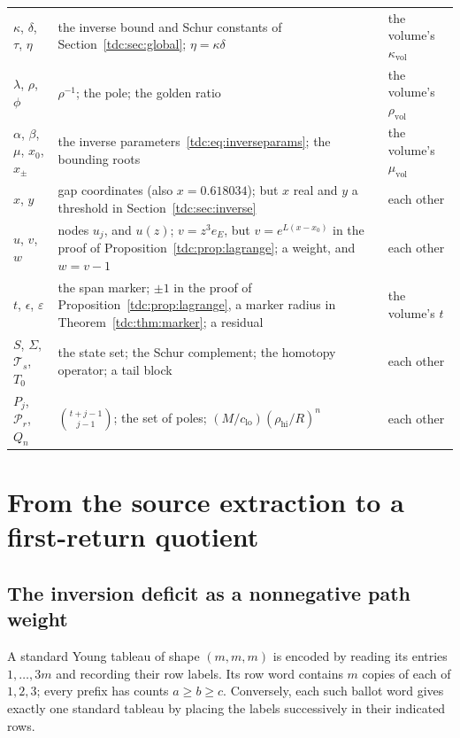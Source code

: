 \documentclass[11pt]{article}
\theoremstyle{definition}\newtheorem{definition}[theorem]{Definition}
\theoremstyle{remark}\newtheorem{remark}[theorem]{Remark}
\newcommand{\PP}{\mathcal P}
\newcommand{\rhoh}{\rho_{\mathrm{hi}}}
\newcommand{\cl}{c_{\mathrm{lo}}}
\begin{document}
\begin{longtable}{@{}>{\raggedright\arraybackslash}p{0.95in}>{\raggedright\arraybackslash}p{3.3in}>{\raggedright\arraybackslash}p{1.85in}@{}}
$\kappa$, $\delta$, $\tau$, $\eta$ & the inverse bound and Schur constants of Section~\ref{tdc:sec:global}; $\eta=\kappa\delta$ & the volume's $\kappa_{\mathrm{vol}}$\\
$\lambda$, $\rho$, $\phi$ & $\rho^{-1}$; the pole; the golden ratio & the volume's $\rho_{\mathrm{vol}}$\\
$\alpha$, $\beta$, $\mu$, $x_0$, $x_\pm$ & the inverse parameters~\eqref{tdc:eq:inverseparams}; the bounding roots & the volume's $\mu_{\mathrm{vol}}$\\
$x$, $y$ & gap coordinates (also $x=0.618034$); but $x$ real and $y$ a threshold in Section~\ref{tdc:sec:inverse} & each other\\
$u$, $v$, $w$ & nodes $u_j$, and $u(z)$; $v=z^3e_E$, but $v=e^{L(x-x_0)}$ in the proof of Proposition~\ref{tdc:prop:lagrange}; a weight, and $w=v-1$ & each other\\
$t$, $\epsilon$, $\varepsilon$ & the span marker; $\pm1$ in the proof of Proposition~\ref{tdc:prop:lagrange}, a marker radius in Theorem~\ref{tdc:thm:marker}; a residual & the volume's $t$\\
$S$, $\Sigma$, $\mathcal T_s$, $T_0$ & the state set; the Schur complement; the homotopy operator; a tail block & each other\\
$P_j$, $\PP_r$, $Q_n$ & $\binom{t+j-1}{j-1}$; the set of poles; $(M/\cl)(\rhoh/R)^n$ & each other\\
\bottomrule
\end{longtable}
\endgroup


\section{From the source extraction to a first-return quotient}
\label{tdc:sec:model}
\subsection{The inversion deficit as a nonnegative path weight}
A standard Young tableau of shape $(m,m,m)$ is encoded by reading its entries $1,\ldots,3m$ and recording their row labels. Its row word contains $m$ copies of each of $1,2,3$; every prefix has counts $a\ge b\ge c$. Conversely, each such ballot word gives exactly one standard tableau by placing the labels successively in their indicated rows.
\end{document}
